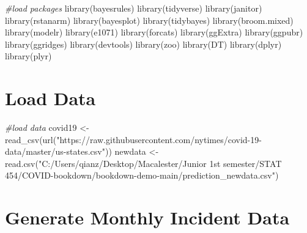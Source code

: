 \documentclass[
]{book}
\newenvironment{Shaded}{\begin{snugshade}}{\end{snugshade}}
\newcommand{\CommentTok}[1]{\textcolor[rgb]{0.56,0.35,0.01}{\textit{#1}}}
\newcommand{\FunctionTok}[1]{\textcolor[rgb]{0.00,0.00,0.00}{#1}}
\newcommand{\NormalTok}[1]{#1}
\newcommand{\OtherTok}[1]{\textcolor[rgb]{0.56,0.35,0.01}{#1}}
\newcommand{\StringTok}[1]{\textcolor[rgb]{0.31,0.60,0.02}{#1}}
\begin{document}
\begin{Shaded}
\begin{Highlighting}[]
\CommentTok{\#load packages}
\FunctionTok{library}\NormalTok{(bayesrules)}
\FunctionTok{library}\NormalTok{(tidyverse)}
\FunctionTok{library}\NormalTok{(janitor)}
\FunctionTok{library}\NormalTok{(rstanarm)}
\FunctionTok{library}\NormalTok{(bayesplot)}
\FunctionTok{library}\NormalTok{(tidybayes)}
\FunctionTok{library}\NormalTok{(broom.mixed)}
\FunctionTok{library}\NormalTok{(modelr)}
\FunctionTok{library}\NormalTok{(e1071)}
\FunctionTok{library}\NormalTok{(forcats)}
\FunctionTok{library}\NormalTok{(ggExtra)}
\FunctionTok{library}\NormalTok{(ggpubr)}
\FunctionTok{library}\NormalTok{(ggridges)}
\FunctionTok{library}\NormalTok{(devtools)}
\FunctionTok{library}\NormalTok{(zoo)}
\FunctionTok{library}\NormalTok{(DT)}
\FunctionTok{library}\NormalTok{(dplyr)}
\FunctionTok{library}\NormalTok{(plyr)}
\end{Highlighting}
\end{Shaded}

\hypertarget{load-data}{%
\section{Load Data}\label{load-data}}

\begin{Shaded}
\begin{Highlighting}[]
\CommentTok{\#load data}
\NormalTok{covid19 }\OtherTok{\textless{}{-}} \FunctionTok{read\_csv}\NormalTok{(}\FunctionTok{url}\NormalTok{(}\StringTok{"https://raw.githubusercontent.com/nytimes/covid{-}19{-}data/master/us{-}states.csv"}\NormalTok{))}
\NormalTok{newdata }\OtherTok{\textless{}{-}} \FunctionTok{read.csv}\NormalTok{(}\StringTok{"C:/Users/qianz/Desktop/Macalester/Junior 1st semester/STAT 454/COVID{-}bookdown/bookdown{-}demo{-}main/prediction\_newdata.csv"}\NormalTok{)}
\end{Highlighting}
\end{Shaded}

\hypertarget{generate-monthly-incident-data}{%
\section{Generate Monthly Incident Data}\label{generate-monthly-incident-data}}
\end{document}
